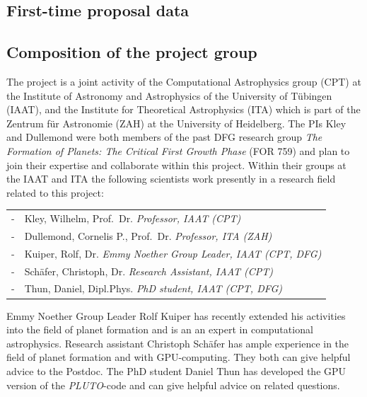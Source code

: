 \documentclass[10pt,fleqn,twoside]{article}
\newcommand{\PLUTO}{{\it PLUTO}}
\begin{document}
\subsection{First-time proposal data}

\subsection{Composition of the project group}
The project is a joint activity of the Computational Astrophysics group (CPT) at the Institute of Astronomy and Astrophysics of the
University of T\"ubingen (IAAT), and the Institute for Theoretical Astrophysics (ITA) which is part of the
Zentrum f\"ur Astronomie (ZAH) at the University of Heidelberg. The PIs Kley and Dullemond were both members
of the past DFG research group {\it The Formation of Planets: The Critical First Growth Phase} (FOR 759)
and plan to join their expertise and collaborate within this project.
Within their groups at  the IAAT and ITA the following scientists work presently in a research field related to this project:

\begin{center}
\begin{tabular}{cp{}}
- & Kley, Wilhelm, Prof.~Dr. \hfill {\it \small  Professor, IAAT (CPT)} \\[0.1cm]
- & Dullemond, Cornelis P., Prof.~Dr. \hfill {\it \small  Professor, ITA (ZAH)} \\[0.1cm]
- & Kuiper, Rolf, Dr. \hfill {\it \small  Emmy Noether Group Leader, IAAT (CPT, DFG)} \\[0.1cm]
- & Sch\"afer, Christoph, Dr. \hfill {\it \small  Research Assistant, IAAT (CPT)} \\[0.1cm]
- & Thun, Daniel, Dipl.Phys. \hfill {\it \small  PhD student, IAAT (CPT, DFG)} \\[0.1cm]
\end{tabular}
\end{center}
Emmy Noether Group Leader Rolf Kuiper has recently extended his activities into the field of planet formation and is an
an expert in computational astrophysics.
Research assistant Christoph Sch\"afer has ample experience in the field of planet formation and with GPU-computing.
They both can give helpful advice to the Postdoc.
The PhD student Daniel Thun has developed the GPU version of the \PLUTO-code and can give helpful advice on related questions.
\end{document}
